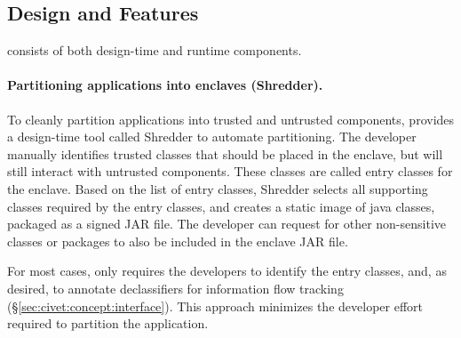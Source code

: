 \subsection{Design and Features}

\sysname{} consists of both design-time and runtime components.  

\paragraph{Partitioning \java{} applications into enclaves (Shredder).}
To cleanly partition \java{} applications into
 trusted and untrusted components,
\sysname{} provides a design-time tool called Shredder
to automate partitioning.
The developer manually identifies trusted classes that should be placed in the enclave,
but will still interact with untrusted components.
These classes are called entry classes for the enclave.
Based on the list of entry classes, 
Shredder selects all supporting classes required by the entry classes,
and creates a static image of java classes, packaged as a signed JAR file.
The developer can request for other non-sensitive classes or packages to also be included in the enclave JAR file.


For most cases, \sysname{} only requires the developers
to identify the entry classes, and, as desired, to annotate declassifiers for information flow tracking (\S\ref{sec:civet:concept:interface}).
This approach minimizes the developer effort required to partition the application.


